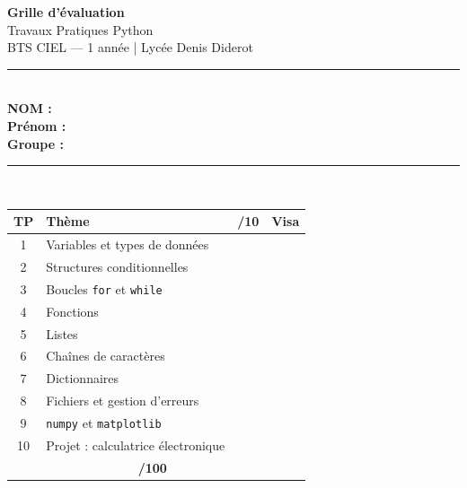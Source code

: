 \documentclass[10pt,a4paper]{article}
\renewcommand{\arraystretch}{1.9}
\begin{document}

\thispagestyle{empty}
\begin{center}
  \vspace*{1.5cm}
  {\Huge\bfseries Grille d'évaluation}\\[0.4cm]
  {\Large Travaux Pratiques Python}\\[0.3cm]
  {\large BTS CIEL --- 1\iere{} année \quad | \quad Lycée Denis Diderot}\\[2cm]
  \rule{12cm}{0.8pt}\\[0.8cm]
  {\large\bfseries NOM : \underline{\hspace{6cm}}}\\[0.7cm]
  {\large\bfseries Prénom : \underline{\hspace{5.5cm}}}\\[0.7cm]
  {\large\bfseries Groupe : \underline{\hspace{5.6cm}}}\\[1.2cm]
  \rule{12cm}{0.8pt}\\[1.2cm]
  {\renewcommand{\arraystretch}{1.4}
  \begin{tabular}{|c|l|c|c|}
    \hline
    \rowcolor{rowhdr}
    \textbf{TP} & \textbf{Thème} & \textbf{/10} & \textbf{Visa} \\
    \hline
    1  & Variables et types de données           & & \\ \hline
    2  & Structures conditionnelles              & & \\ \hline
    3  & Boucles \texttt{for} et \texttt{while}  & & \\ \hline
    4  & Fonctions                               & & \\ \hline
    5  & Listes                                  & & \\ \hline
    6  & Chaînes de caractères                   & & \\ \hline
    7  & Dictionnaires                           & & \\ \hline
    8  & Fichiers et gestion d'erreurs           & & \\ \hline
    9  & \texttt{numpy} et \texttt{matplotlib}   & & \\ \hline
    10 & Projet : calculatrice électronique      & & \\ \hline
    \rowcolor{gray!20}
    \multicolumn{2}{|r|}{\textbf{Total}} & \multicolumn{2}{c|}{\textbf{/100}} \\ \hline
  \end{tabular}}
\end{center}
\end{document}
